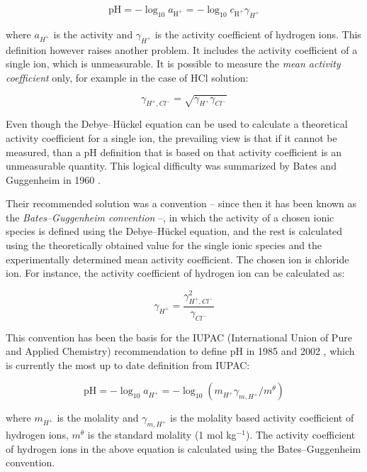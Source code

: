 \documentclass[manuscript=article, journal=jceda8]{achemso}
\begin{document}
\begin{equation}
\textrm{pH} = -\log_{10} a_{\textrm{H}^+} = -\log_{10} c_{\textrm{H}^+} \gamma_{H^+}
\end{equation}

where $a_{H^+}$ is the activity and $\gamma_{H^+}$ is the activity coefficient of hydrogen ions. This definition however raises another problem. It includes the activity coefficient of a single ion, which is unmeasurable. It is possible to measure the \emph{mean activity coefficient} only, for example in the case of HCl solution:

\begin{equation}
\gamma_{H^+, Cl^-} = \sqrt{\gamma_{H^+} \gamma_{Cl^-}}
\end{equation}


Even though the Debye--Hückel equation can be used to calculate a theoretical activity coefficient for a single ion, the prevailing view is that if it cannot be measured, than a pH definition that is based on that activity coefficient is an unmeasurable quantity. This logical difficulty was summarized by Bates and Guggenheim in 1960 \cite{bates1960report}. 

Their recommended solution was a convention -- since then it has been known as the \emph{Bates--Guggenheim convention} --, in which the activity of a chosen ionic species is defined using the Debye--Hückel equation, and the rest is calculated using the theoretically obtained value for the single ionic species and the experimentally determined mean activity coefficient. The chosen ion is chloride ion. For instance, the activity coefficient of hydrogen ion can be calculated as:

\begin{equation}
\gamma_{H^+} = \frac{\gamma_{H^+, Cl^-}^2}{\gamma_{Cl^-}}
\end{equation}

This convention has been the basis for the IUPAC (International Union of Pure and Applied Chemistry) recommendation to define pH in 1985 \cite{covington1985definition} and 2002 \cite{buck2002measurement}, which is currently the most up to date definition from IUPAC:

\begin{equation}
\textrm{pH}= -\log_{10}a_{H^+} = -\log_{10}(m_{H^+} \gamma_{m, H^+}/m^\theta)
\end{equation}

where $m_{H^+}$ is the molality and $\gamma_{m, H^+}$ is the molality based activity coefficient of hydrogen ions, $m^\theta$ is the standard molality (1 mol kg$^{-1}$). The activity coefficient of hydrogen ions in the above equation is calculated using the Bates--Guggenheim convention.
\end{document}
